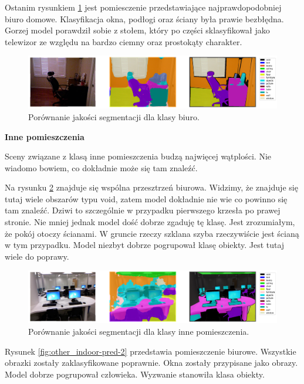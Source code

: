Ostanim rysunkiem {\ref{fig:office-pred-3}} jest pomiesczenie przedstawiające najprawdopodobniej biuro domowe. Klasyfikacja okna, podłogi oraz ściany była prawie bezbłędna. Gorzej model porawdził sobie z stołem, który po części sklasyfikował jako telewizor ze względu na bardzo ciemny oraz prostokąty charakter.

\begin{figure}[ht!]
    \centering
    \includegraphics[width=\textwidth]{img/preds_analysis/gt_vs_pred/office-3.png}
    \caption{Porównanie jakości segmentacji dla klasy biuro.}
    \label{fig:office-pred-3}
\end{figure}

\noindent
\textbf{Inne pomieszczenia}

Sceny związane z klasą inne pomieszczenia budzą najwięcej wątplości. Nie wiadomo bowiem, co dokładnie może się tam znaleźć.

Na rysunku \ref{fig:other_indoor-pred-1} znajduje się wspólna przesztrzeń biurowa. Widzimy, że znajduje się tutaj wiele obszarów typu void, zatem model dokładnie nie wie co powinno się tam znaleźć. Dziwi to szczególnie w przypadku pierwszego krzesła po prawej stronie. Nie mniej jednak model dość dobrze zgaduję tę klasę. Jest zrozumiałym, że pokój otoczy ścianami. W gruncie rzeczy szklana szyba rzeczywiście jest ścianą w tym przypadku. Model niezbyt dobrze pogrupował klasę obiekty. Jest tutaj wiele do poprawy.

\begin{figure}[ht!]
    \centering
    \includegraphics[width=\textwidth]{img/preds_analysis/gt_vs_pred/other_indoor-1.png}
    \caption{Porównanie jakości segmentacji dla klasy inne pomieszczenia.}
    \label{fig:other_indoor-pred-1}
\end{figure}

Rysunek \ref{fig:other_indoor-pred-2} przedstawia pomieszczenie biurowe. Wszystkie obrazki zostały zaklasyfikowane poprawnie. Okna zostały przypisane jako obrazy. Model dobrze pogrupował człowieka. Wyzwanie stanowiła klasa obiekty.

